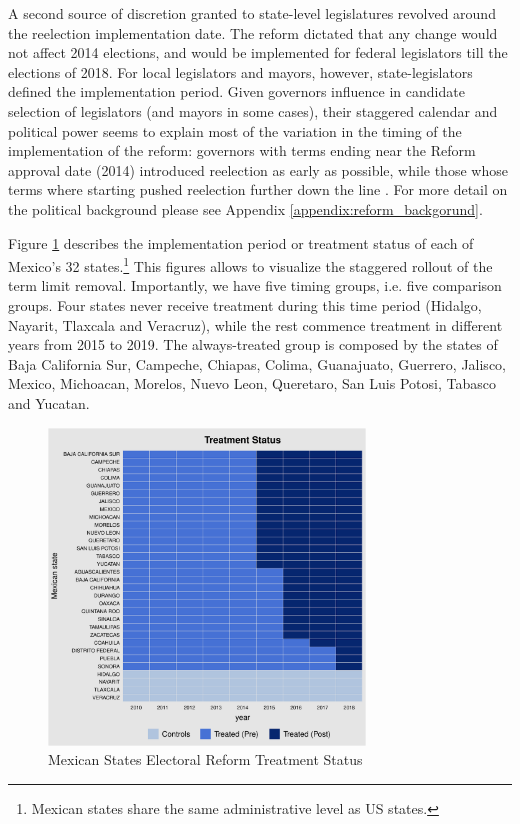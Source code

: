 \documentclass[12pt]{amsart}
\numberwithin{equation}{section}
\theoremstyle{definition}
\theoremstyle{definition}
\theoremstyle{definition}
\begin{document}
A second source of discretion granted to state-level legislatures revolved around the reelection implementation date. The reform dictated that any change would not affect 2014 elections, and would be implemented for federal legislators till the elections of 2018. For local legislators and mayors, however, state-legislators defined the implementation period. Given governors influence in candidate selection of legislators (and mayors in some cases), their staggered calendar and political power seems to explain most of the variation in the timing of the implementation of the reform: governors with terms ending near the Reform approval date (2014) introduced reelection as early as possible, while those whose terms where starting pushed reelection further down the line \citep{motolinia_2020}. For more detail on the political background please see Appendix \ref{appendix:reform_backgorund}.
   
Figure \ref{fig:treatment_status} describes the implementation period or treatment status of each of Mexico's 32 states.\footnote{Mexican states share the same administrative level as US states.} This figures allows to visualize the staggered rollout of the term limit removal. Importantly, we have five timing groups, i.e. five comparison groups. Four states never receive treatment during this time period (Hidalgo, Nayarit, Tlaxcala and Veracruz), while the rest commence treatment in different years from 2015 to 2019. The always-treated group is composed by the states of Baja California Sur, Campeche, Chiapas, Colima, Guanajuato, Guerrero, Jalisco, Mexico, Michoacan, Morelos, Nuevo Leon, Queretaro, San Luis Potosi, Tabasco and Yucatan. 
 
\begin{figure}[H]   
\centering 
\caption{Mexican States Electoral Reform Treatment Status}
\label{fig:treatment_status}
\includegraphics[width=0.75\textwidth]{Figures/reform_treatmentstatus.pdf}     
\captionsetup{justification=centering} 
\end{figure}   
 
\end{document}
